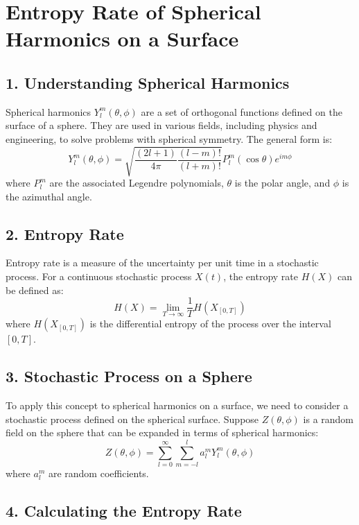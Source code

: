 
	
\section*{Entropy Rate of Spherical Harmonics on a Surface}

\subsection*{1. Understanding Spherical Harmonics}

Spherical harmonics \( Y_l^m(\theta, \phi) \) are a set of orthogonal functions defined on the surface of a sphere. They are used in various fields, including physics and engineering, to solve problems with spherical symmetry. The general form is:
\[
Y_l^m(\theta, \phi) = \sqrt{\frac{(2l+1)}{4\pi} \frac{(l-m)!}{(l+m)!}} P_l^m(\cos \theta) e^{im\phi}
\]
where \( P_l^m \) are the associated Legendre polynomials, \( \theta \) is the polar angle, and \( \phi \) is the azimuthal angle.

\subsection*{2. Entropy Rate}

Entropy rate is a measure of the uncertainty per unit time in a stochastic process. For a continuous stochastic process \( X(t) \), the entropy rate \( H(X) \) can be defined as:
\[
H(X) = \lim_{T \to \infty} \frac{1}{T} H(X_{[0,T]})
\]
where \( H(X_{[0,T]}) \) is the differential entropy of the process over the interval \([0, T]\).

\subsection*{3. Stochastic Process on a Sphere}

To apply this concept to spherical harmonics on a surface, we need to consider a stochastic process defined on the spherical surface. Suppose \( Z(\theta, \phi) \) is a random field on the sphere that can be expanded in terms of spherical harmonics:
\[
Z(\theta, \phi) = \sum_{l=0}^{\infty} \sum_{m=-l}^{l} a_l^m Y_l^m(\theta, \phi)
\]
where \( a_l^m \) are random coefficients.

\subsection*{4. Calculating the Entropy Rate}


